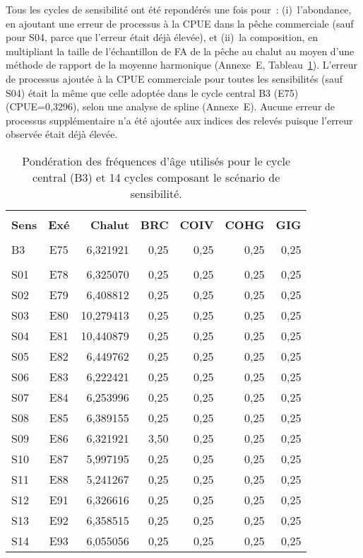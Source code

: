 \documentclass[11pt]{book}
\newcommand{\AppEqn}{Annexe~E}
\begin{document}
Tous les cycles de sensibilit\'{e} ont \'{e}t\'{e} repond\'{e}r\'{e}s une fois pour~: (i)~l'abondance, en ajoutant une erreur de processus \`{a} la CPUE dans la p\^{e}che commerciale (sauf pour S04, parce que l'erreur \'{e}tait d\'{e}j\`{a} \'{e}lev\'{e}e), et (ii)~la composition, en multipliant la taille de l'\'{e}chantillon de FA de la p\^{e}che au chalut au moyen d'une m\'{e}thode de rapport de la moyenne harmonique (\AppEqn, Tableau~\ref{tab:sensAFwts}).
L'erreur de processus ajout\'{e}e \`{a} la CPUE commerciale pour toutes les sensibilit\'{e}s (sauf S04) \'{e}tait la m\^{e}me que celle adopt\'{e}e dans le cycle central B3 (E75) (CPUE=0,3296), selon une analyse de spline (\AppEqn).
Aucune erreur de processus suppl\'{e}mentaire n'a \'{e}t\'{e} ajout\'{e}e aux indices des relev\'{e}s puisque l'erreur observ\'{e}e \'{e}tait d\'{e}j\`{a} \'{e}lev\'{e}e.

\setlength{\tabcolsep}{4pt}
\begin{table}[!h]
\centering
\caption{Pond\'{e}ration des fr\'{e}quences d'\^{a}ge utilis\'{e}s pour le cycle central (B3) et 14 cycles composant le sc\'{e}nario de sensibilit\'{e}.}
\label{tab:sensAFwts}
\usefont{\encodingdefault}{\familydefault}{\seriesdefault}{\shapedefault}\small
\begin{tabular}{lcrrrrr}
\hline \\ [-1.5ex]
{\bf Sens} & {\bf Ex\'{e}} & {\bf Chalut} & {\bf BRC} & {\bf COIV} & {\bf COHG} & {\bf GIG} \\ [0.2ex]
\hline \\ [-1.5ex]
B3 & E75 & 6,321921 & 0,25 & 0,25 & 0,25 & 0,25 \\
\hdashline \\ [-1,75ex]
S01 & E78 &  6,325070 & 0,25 & 0,25 & 0,25 & 0,25 \\
S02 & E79 &  6,408812 & 0,25 & 0,25 & 0,25 & 0,25 \\
S03 & E80 & 10,279413 & 0,25 & 0,25 & 0,25 & 0,25 \\
S04 & E81 & 10,440879 & 0,25 & 0,25 & 0,25 & 0,25 \\
S05 & E82 &  6,449762 & 0,25 & 0,25 & 0,25 & 0,25 \\
S06 & E83 &  6,222421 & 0,25 & 0,25 & 0,25 & 0,25 \\
S07 & E84 &  6,253996 & 0,25 & 0,25 & 0,25 & 0,25 \\
S08 & E85 &  6,389155 & 0,25 & 0,25 & 0,25 & 0,25 \\
S09 & E86 &  6,321921 & 3,50 & 0,25 & 0,25 & 0,25 \\
S10 & E87 &  5,997195 & 0,25 & 0,25 & 0,25 & 0,25 \\
S11 & E88 &  5,241267 & 0,25 & 0,25 & 0,25 & 0,25 \\
S12 & E91 &  6,326616 & 0,25 & 0,25 & 0,25 & 0,25 \\
S13 & E92 &  6,358515 & 0,25 & 0,25 & 0,25 & 0,25 \\
S14 & E93 &  6,055056 & 0,25 & 0,25 & 0,25 & 0,25 \\
\hline
\end{tabular}
\usefont{\encodingdefault}{\familydefault}{\seriesdefault}{\shapedefault}\normalsize
\end{table}
\end{document}
